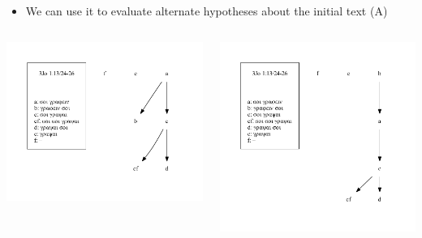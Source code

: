 \documentclass[10pt]{beamer}
\begin{document}
	\begin{frame}
		\begin{itemize}
			\item We can use it to evaluate alternate hypotheses about the initial text (A)
		\end{itemize}
		\begin{columns}
			\begin{column}{0.45\textwidth}
				\includegraphics[width=\textwidth]{../img/B25K1V13U24-26-local-stemma-incomplete.pdf}
			\end{column}
			\begin{column}{0.45\textwidth}
				\includegraphics[width=\textwidth]{../img/B25K1V13U24-26-local-stemma-b-initial.pdf}
			\end{column}
		\end{columns}
	\end{frame}
\end{document}
